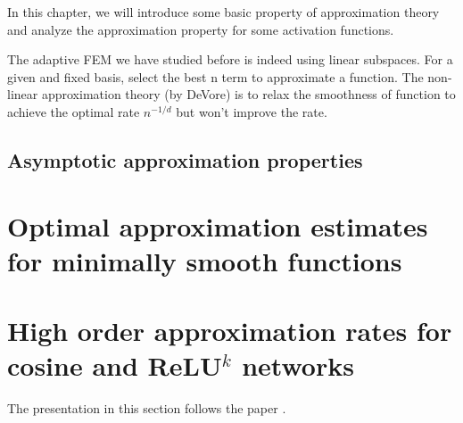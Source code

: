 In this chapter, we will introduce some basic property of approximation theory and analyze the approximation property for some activation functions.

 
	The adaptive FEM we have studied before is indeed using linear
	subspaces. For a given and fixed basis, select the best n term to
	approximate a function. The non-linear approximation theory (by
	DeVore) is to relax the smoothness of function to achieve the optimal
	rate $n^{-1/d}$ but won't improve the rate.





\section{Asymptotic approximation properties}



%
\chapter{Optimal approximation estimates for minimally smooth functions}

\chapter{High order approximation rates for cosine and ReLU$^k$ networks}
The presentation in this section follows the paper \cite{siegel2020high}.



